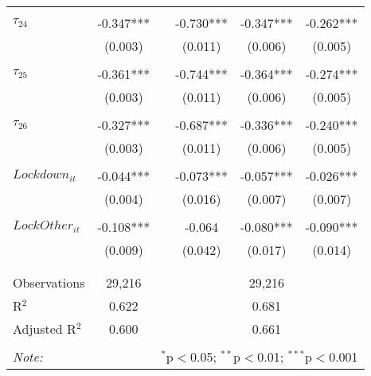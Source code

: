 \begin{tabular}{@{\extracolsep{-5pt}}lccccc}
                &           &&           &           &           \\[-2.1ex]
$\tau_{24}$     & -0.347*** && -0.730*** & -0.347*** & -0.262*** \\
                &  (0.003)  &&  (0.011)  &  (0.006)  &  (0.005)  \\
                &           &&           &           &           \\[-2.1ex]
$\tau_{25}$     & -0.361*** && -0.744*** & -0.364*** & -0.274*** \\
                &  (0.003)  &&  (0.011)  &  (0.006)  &  (0.005)  \\
                &           &&           &           &           \\[-2.1ex]
$\tau_{26}$     & -0.327*** && -0.687*** & -0.336*** & -0.240*** \\
                &  (0.003)  &&  (0.011)  &  (0.006)  &  (0.005)  \\
                &           &&           &           &           \\[-1.ex]
$Lockdown_{it}$        & -0.044*** && -0.073*** & -0.057*** & -0.026*** \\
                &  (0.004)  &&  (0.016)  &  (0.007)  &  (0.007)  \\
                &           &&           &           &           \\[-2.1ex]
$LockOther_{it}$ & -0.108*** &&   -0.064  & -0.080*** & -0.090*** \\
                &  (0.009)  &&  (0.042)  &  (0.017)  &  (0.014)  \\
                &           &&           &           &           \\[-2.1ex]

\hline \\[-1.8ex] 
Observations     & 29,216 && \multicolumn{3}{c}{29,216} \\ 
R$^{2}$          &  0.622 && \multicolumn{3}{c}{0.681 } \\ 
Adjusted R$^{2}$ &  0.600 && \multicolumn{3}{c}{0.661 } \\ 
\hline 
\hline \\[-1.8ex] 
\textit{Note:}  & \multicolumn{5}{r}{$^{*}$p$<$0.05; $^{**}$p$<$0.01; $^{***}$p$<$0.001} \\ 
\end{tabular} 